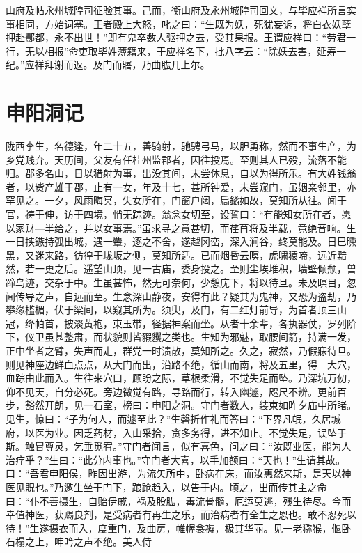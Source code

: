 \documentclass[a4paper,12pt,UTF8,twoside]{ctexbook}
\begin{document}
山府及帖永州城隍司征验其事。己而，衡山府及永州城隍司回文，与毕应祥所言实事相同，方始词塞。王者殿上大怒，叱之曰：“生既为妖，死犹妄诉，将白衣妖孽押赴酆都，永不出世！”即有鬼卒数人驱押之去，受其果报。王谓应祥曰：“劳君一行，无以相报”命吏取毕姓薄籍来，于应祥名下，批八字云：“除妖去害，延寿一纪。”应祥拜谢而返。及门而寤，乃曲肱几上尔。

\chapter{申阳洞记}

陇西李生，名德逢，年二十五，善骑射，驰骋弓马，以胆勇称，然而不事生产，为乡党贱弃。天历间，父友有任桂州监郡者，因往投焉。至则其人已殁，流落不能归。郡多名山，日以猎射为事，出没其间，末尝休息，自以为得所乐。有大姓钱翁者，以赀产雄于郡，止有一女，年及十七，甚所钟爱，未尝窥门，虽姻亲邻里，亦罕见之。一夕，风雨晦冥，失女所在，门窗户闼，扃鐍如故，莫知所从往。闻于官，祷于伸，访于四境，悄无踪迹。翁念女切至，设誓曰：“有能知女所在者，愿以家财—半给之，并以女事焉。”虽求寻之意甚切，而荏苒将及半载，竟绝音响。生一日挟鏃持弧出城，遇一麞，逐之不舍，遂越冈峦，深入涧谷，终莫能及。日巳曛黑，又迷来路，彷徨于垅坂之侧，莫知所适。已而烟昏云瞑，虎啸猿啼，远近黯然，若一更之后。遥望山顶，见一古庙，委身投之。至则尘埃堆积，墙壁倾颓，兽蹄鸟迹，交杂于中。生虽甚怖，然无可奈何，少憩庑下，将以待旦。未及瞑目，忽闻传导之声，自远而至。生念深山静夜，安得有此？疑其为鬼神，又恐为盗劫，乃攀缘槛楣，伏于梁间，以窥其所为。须臾，及门，有二红灯前导，为首者顶三山冠，绛帕首，披淡黄袍，束玉带，径据神案而坐。从者十余辈，各执器仗，罗列阶下，仪卫虽甚整肃，而状貌则皆豭貜之类也。生知为邪魅，取腰间箭，持满一发，正中坐者之臂，失声而走，群党一时溃散，莫知所之。久之，寂然，乃假寐待旦。则见神座边鲜血点点，从大门而出，沿路不绝，循山而南，将及五里，得—大穴，血踪由此而入。生往来穴口，顾盼之际，草根柔滑，不觉失足而坠。乃深坑万仞，仰不见天，自分必死。旁边微觉有路，寻路而行，转入幽遽，咫尺不辨。更前百步，豁然开朗，见一石室，榜曰：申阳之洞。守门者数人，装束如昨夕庙中所睹。见生，惊曰：“子为何人，而遽至此？”生磬折作礼而答曰：“下界凡氓，久居城府，以医为业。因乏药材，入山采拾，贪多务得，进不知止。不觉失足，误坠于斯。触冒尊灵，乞垂觅宥。”守门者闻言，似有喜色，问之曰：“汝既业医，能为人治疗乎？”生曰：“此分内事也。”守门者大喜，以手加额曰：“天也！”生请其故。曰：“吾君申阳侯，昨因出游，为流矢所中，卧病在床，而汝惠然来斯，是天以神医见貺也。”乃邀生坐于门下，踉跄趋入，以告于内。顷之，出而传其主之命曰：“仆不善摄生，自贻伊戚，祸及股肱，毒流骨髓，厄运莫逃，残生待尽。今而幸值神医，获赐良剂，是受病者有再生之乐，而治病者有全生之恩也。敢不忍死以待！”生遂摄衣而入，度重门，及曲房，帷幄衾褥，极其华丽。见一老猕猴，偃卧石榻之上，呻吟之声不绝。美人侍
\end{document}
